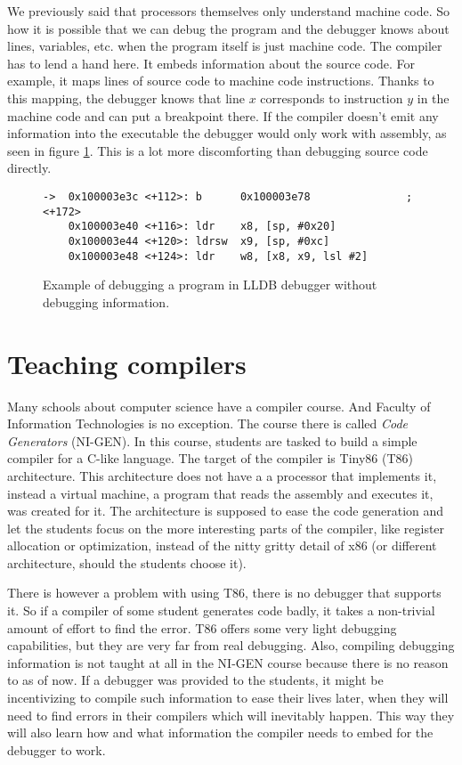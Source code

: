 We previously said that processors themselves only understand machine code. So
how it is possible that we can debug the program and the debugger knows about
lines, variables, etc. when the program itself is just machine code. The
compiler has to lend a hand here. It embeds information about the source code.
For example, it maps lines of source code to machine code instructions. Thanks
to this mapping, the debugger knows that line $x$ corresponds to instruction
$y$ in the machine code and can put a breakpoint there. If the compiler doesn't
emit any information into the executable the debugger would only work with
assembly, as seen in figure \ref{fig:lldb-debug2}. This is a lot more
discomforting than debugging source code directly.

\begin{figure}\label{fig:lldb-debug2}
\begin{lstlisting}
->  0x100003e3c <+112>: b      0x100003e78               ; <+172>
    0x100003e40 <+116>: ldr    x8, [sp, #0x20]
    0x100003e44 <+120>: ldrsw  x9, [sp, #0xc]
    0x100003e48 <+124>: ldr    w8, [x8, x9, lsl #2]
\end{lstlisting}
\caption{Example of debugging a program in LLDB debugger without debugging information.}
\end{figure}

\section{Teaching compilers}
Many schools about computer science have a compiler course. And Faculty of
Information Technologies is no exception. The course there is called
\textit{Code Generators} (NI-GEN). In this course, students are tasked to build
a simple compiler for a C-like language. The target of the compiler is Tiny86
(T86) architecture. This architecture  does not have a a processor that implements it, instead a virtual
machine, a program that reads the assembly and executes it, was created for it.
The architecture is supposed to ease the code generation and let the students
focus on the more interesting parts of the compiler, like register allocation
or optimization, instead of the nitty gritty detail of x86 (or different
architecture, should the students choose it).

There is however a problem with using T86, there is no debugger that supports
it. So if a compiler of some student generates code badly, it takes a
non-trivial amount of effort to find the error. T86 offers some very light
debugging capabilities, but they are very far from real debugging. Also,
compiling debugging information is not taught at all in the NI-GEN course
because there is no reason to as of now. If a debugger was provided to the
students, it might be incentivizing to compile such information to ease their
lives later, when they will need to find errors in their compilers which will
inevitably happen. This way they will also learn how and what information the
compiler needs to embed for the debugger to work.

